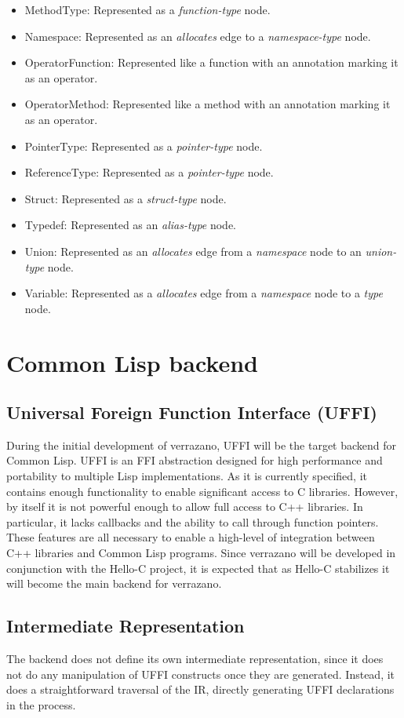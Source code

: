 \documentclass[12pt]{article}
\begin{document}
\begin{itemize}
\item MethodType: Represented as a \emph{function-type} node.
\item Namespace: Represented as an \emph{allocates} edge to a \emph{namespace-type} node.
\item OperatorFunction: Represented like a function with an annotation marking it as an operator.
\item OperatorMethod: Represented like a method with an annotation marking it as an operator.
\item PointerType: Represented as a \emph{pointer-type} node.
\item ReferenceType: Represented as a \emph{pointer-type} node.
\item Struct: Represented as a \emph{struct-type} node.
\item Typedef: Represented as an \emph{alias-type} node.
\item Union: Represented as an \emph{allocates} edge from a \emph{namespace} node to an \emph{union-type} node. 
\item Variable: Represented as a \emph{allocates} edge from a \emph{namespace} node to a \emph{type} node.
\end{itemize} 

\section{Common Lisp backend}

\subsection{Universal Foreign Function Interface (UFFI)}
During the initial development of verrazano, UFFI \cite{FFI} will be the target backend for Common Lisp. UFFI is an FFI abstraction designed for high performance and portability to multiple Lisp implementations. As it is currently specified, it contains enough functionality to enable significant access to C libraries. However, by itself it is not powerful enough to allow full access to C++ libraries. In particular, it lacks callbacks and the ability to call through function pointers. These features are all necessary to enable a high-level of integration between C++ libraries and Common Lisp programs. Since verrazano will be developed in conjunction with the Hello-C project, it is expected that as Hello-C stabilizes it will become the main backend for verrazano. 

\subsection{Intermediate Representation}
The backend does not define its own intermediate representation, since it does not do any manipulation of UFFI constructs once they are generated. Instead, it does a straightforward traversal of the IR, directly generating UFFI declarations in the process.
\end{document}
